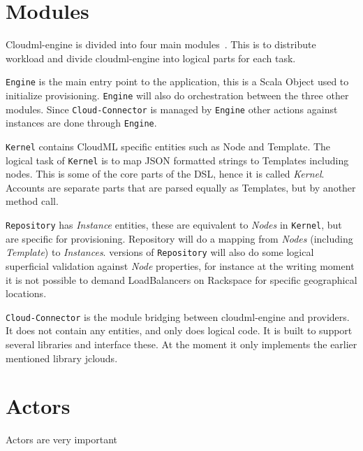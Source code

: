 \section{Modules}

Cloudml-engine is divided into four main modules~.
This is to distribute workload and divide cloudml-engine into logical parts for each task.

\texttt{Engine} is the main entry point to the application, this is a Scala Object used to initialize
provisioning.
\texttt{Engine} will also do orchestration between the three other modules.
Since \texttt{Cloud-Connector} is managed by \texttt{Engine} other actions against 
instances are done through \texttt{Engine}.

\texttt{Kernel} contains CloudML specific entities such as Node and Template.
The logical task of \texttt{Kernel} is to map JSON formatted strings to Templates including nodes.
This is some of the core parts of the DSL, hence it is called \emph{Kernel}.
Accounts are separate parts that are parsed equally as Templates, but by another method call.

\texttt{Repository} has \emph{Instance} entities, these are equivalent to \emph{Nodes} in \texttt{Kernel},
but are specific for provisioning. Repository will do a mapping from \emph{Nodes} (including \emph{Template})
to \emph{Instances}.  versions of \texttt{Repository} will also do some logical superficial validation
against \emph{Node} properties, for instance at the writing moment it is not possible to 
demand LoadBalancers on Rackspace for specific geographical locations.

\texttt{Cloud-Connector} is the module bridging between cloudml-engine and providers.
It does not contain any entities, and only does logical code. 
It is built to support several libraries and interface these. At the moment it only implements the earlier
mentioned library jclouds.


\section{Actors}

Actors are very important
